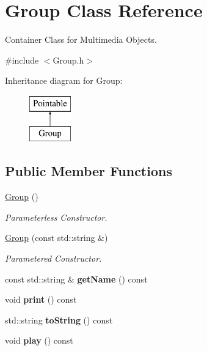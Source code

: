 \hypertarget{classGroup}{\section{Group Class Reference}
\label{classGroup}
}


Container Class for Multimedia Objects.  




{\ttfamily \#include $<$Group.\-h$>$}

Inheritance diagram for Group\-:\begin{figure}[H]
\begin{center}
\leavevmode
\includegraphics[height=2.000000cm]{classGroup}
\end{center}
\end{figure}
\subsection*{Public Member Functions}
\begin{DoxyCompactItemize}
\item 
\hypertarget{classGroup_a7b74f9ac68e0504ccf2e2854b7355ff1}{\hyperlink{classGroup_a7b74f9ac68e0504ccf2e2854b7355ff1}{Group} ()}\label{classGroup_a7b74f9ac68e0504ccf2e2854b7355ff1}

\begin{DoxyCompactList}\small\item\em Parameterless Constructor. \end{DoxyCompactList}\item 
\hypertarget{classGroup_a03b66550c572b981322a646a129392ae}{\hyperlink{classGroup_a03b66550c572b981322a646a129392ae}{Group} (const std\-::string \&)}\label{classGroup_a03b66550c572b981322a646a129392ae}

\begin{DoxyCompactList}\small\item\em Parametered Constructor. \end{DoxyCompactList}\item 
\hypertarget{classGroup_a41e1c4f5094ed0d15e5b387a4a5349d0}{const std\-::string \& {\bfseries get\-Name} () const }\label{classGroup_a41e1c4f5094ed0d15e5b387a4a5349d0}

\item 
\hypertarget{classGroup_a70432bd4aca1a8ee19c3b104d54c0c64}{void {\bfseries print} () const }\label{classGroup_a70432bd4aca1a8ee19c3b104d54c0c64}

\item 
\hypertarget{classGroup_aad096e2bceeedd1e1ea22dac8ee614da}{std\-::string {\bfseries to\-String} () const }\label{classGroup_aad096e2bceeedd1e1ea22dac8ee614da}

\item 
\hypertarget{classGroup_aa08edc49e142c99a69f4408cf6d09785}{void {\bfseries play} () const }\label{classGroup_aa08edc49e142c99a69f4408cf6d09785}

\end{DoxyCompactItemize}


